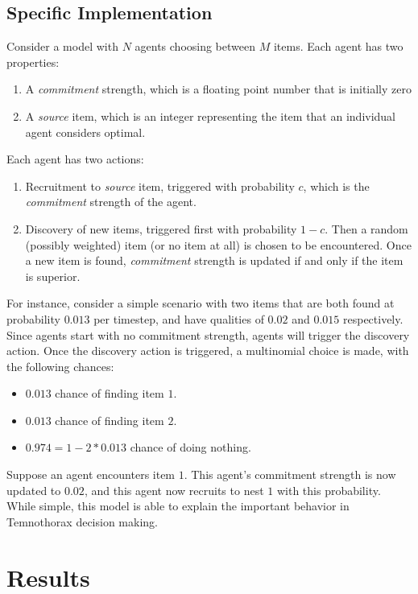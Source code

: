 \documentclass{article}
\begin{document}
\subsection{Specific Implementation}
Consider a model with $N$ agents choosing between $M$ items.
Each agent has two properties:
\begin{enumerate}
    \item A \emph{commitment} strength, which is a floating point number that is initially zero
    \item A \emph{source} item, which is an integer representing the item that an individual agent considers optimal.
\end{enumerate}
Each agent has two actions:
\begin{enumerate}
    \item Recruitment to \emph{source} item, triggered with probability $c$, which is the \emph{commitment} strength of the agent.
    \item Discovery of new items, triggered first with probability $1 - c$. Then a random (possibly weighted) item (or no item at all) is chosen to be encountered. Once a new item is found, \emph{commitment} strength is updated if and only if the item is superior.
\end{enumerate}

For instance, consider a simple scenario with two items that are both found at probability $0.013$ per timestep, and have qualities of $0.02$ and $0.015$ respectively.
Since agents start with no commitment strength, agents will trigger the discovery action.
Once the discovery action is triggered, a multinomial choice is made, with the following chances:
\begin{itemize}
    \item $0.013$ chance of finding item $1$.
    \item $0.013$ chance of finding item $2$.
    \item $0.974 = 1 - 2 * 0.013$ chance of doing nothing.
\end{itemize}

Suppose an agent encounters item $1$. This agent's commitment strength is now updated to $0.02$, and this agent now recruits to nest $1$ with this probability.
While simple, this model is able to explain the important behavior in Temnothorax decision making.

\section{Results}
\end{document}
